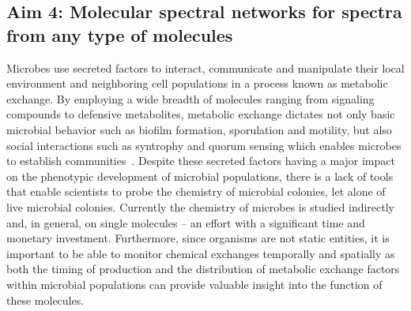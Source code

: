 \documentclass[arial,11pt]{article}
\begin{document}
\subsection{Aim 4: Molecular spectral networks for spectra from any type of molecules}

Microbes use secreted factors to interact, communicate and manipulate their local environment and neighboring cell populations in a process known as metabolic exchange. By employing a wide breadth of molecules ranging from signaling compounds to defensive metabolites, metabolic exchange dictates not only basic microbial behavior such as biofilm formation, sporulation and motility, but also social interactions such as syntrophy and quorum sensing which enables microbes to establish communities~\cite{ng09b,little08,yim07,romero11}. Despite these secreted factors having a major impact on the phenotypic development of microbial populations, there is a lack of tools that enable scientists to probe the chemistry of microbial colonies, let alone of live microbial colonies. Currently the chemistry of microbes is studied indirectly and, in general, on single molecules -- an effort with a significant time and monetary investment.
%
Furthermore, since organisms are not static entities, it is important to be able to monitor chemical exchanges temporally and spatially as both the timing of production and the distribution of metabolic exchange factors within microbial populations can provide valuable insight into the function of these molecules.
\end{document}
